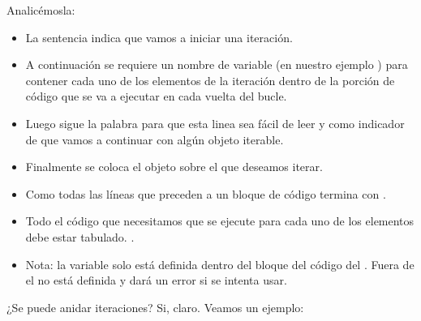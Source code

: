 \documentclass[a5paper,9pt,spanish]{sphinxmanual}
\begin{document}
\sphinxAtStartPar
Analicémosla:
\begin{itemize}
\item {} 
\sphinxAtStartPar
La sentencia  indica que vamos a iniciar una iteración.

\item {} 
\sphinxAtStartPar
A continuación se requiere un nombre de variable (en nuestro
ejemplo ) para contener cada uno de los elementos de la iteración
dentro de la porción de código que se va a ejecutar en cada vuelta del bucle.

\item {} 
\sphinxAtStartPar
Luego sigue la palabra  para que esta linea sea fácil de leer y como
indicador de que vamos a continuar con algún objeto iterable.

\item {} 
\sphinxAtStartPar
Finalmente se coloca el objeto sobre el que deseamos iterar.

\item {} 
\sphinxAtStartPar
Como todas las líneas que preceden a un bloque de código termina con \sphinxcode{\sphinxupquote{:}}.

\item {} 
\sphinxAtStartPar
Todo el código que necesitamos que se ejecute para cada uno de los elementos
debe estar tabulado. .

\item {} 
\sphinxAtStartPar
Nota: la variable  solo está definida dentro del bloque del
código del . Fuera de el no está definida y dará un error si se
intenta usar.

\end{itemize}

\sphinxAtStartPar
¿Se puede anidar iteraciones?
Si, claro. Veamos un ejemplo:

\begin{sphinxVerbatim}[commandchars=\\\{\}]
  \PYG{p}{[} \PYG{p}{[} \PYG{p}{]} \PYG{p}{[} \PYG{p}{]} \PYG{p}{[} \PYG{p}{]} \PYG{p}{]}

   
       

\end{sphinxVerbatim}
\end{document}
